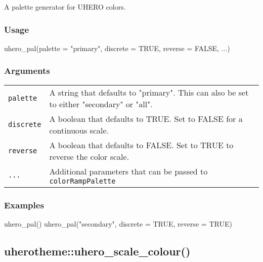 \documentclass[
  letterpaper,
  DIV=11,
  numbers=noendperiod]{scrreport}
\newenvironment{Shaded}{\begin{snugshade}}{\end{snugshade}}
\newcommand{\AttributeTok}[1]{\textcolor[rgb]{0.40,0.45,0.13}{#1}}
\newcommand{\ConstantTok}[1]{\textcolor[rgb]{0.56,0.35,0.01}{#1}}
\newcommand{\FunctionTok}[1]{\textcolor[rgb]{0.28,0.35,0.67}{#1}}
\newcommand{\NormalTok}[1]{\textcolor[rgb]{0.00,0.23,0.31}{#1}}
\newcommand{\StringTok}[1]{\textcolor[rgb]{0.13,0.47,0.30}{#1}}
\begin{document}
A palette generator for UHERO colors.

\subsubsection{Usage}\label{usage-72}

\begin{Shaded}
\begin{Highlighting}[]
\FunctionTok{uhero\_pal}\NormalTok{(}\AttributeTok{palette =} \StringTok{"primary"}\NormalTok{, }\AttributeTok{discrete =} \ConstantTok{TRUE}\NormalTok{, }\AttributeTok{reverse =} \ConstantTok{FALSE}\NormalTok{, ...)}
\end{Highlighting}
\end{Shaded}

\subsubsection{Arguments}\label{arguments-72}

\begin{longtable}[]{@{}ll@{}}
\toprule\noalign{}
\endhead
\bottomrule\noalign{}
\endlastfoot
\texttt{palette} & A string that defaults to "primary". This can also be
set to either "secondary" or "all". \\
\texttt{discrete} & A boolean that defaults to TRUE. Set to FALSE for a
continuous scale. \\
\texttt{reverse} & A boolean that defaults to FALSE. Set to TRUE to
reverse the color scale. \\
\texttt{...} & Additional parameters that can be passed to
\texttt{colorRampPalette} \\
\end{longtable}

\subsubsection{Examples}\label{examples-72}

\begin{Shaded}
\begin{Highlighting}[]
\FunctionTok{uhero\_pal}\NormalTok{()}
\FunctionTok{uhero\_pal}\NormalTok{(}\StringTok{"secondary"}\NormalTok{, }\AttributeTok{discrete =} \ConstantTok{TRUE}\NormalTok{, }\AttributeTok{reverse =} \ConstantTok{TRUE}\NormalTok{)}
\end{Highlighting}
\end{Shaded}

\subsection{uherotheme::uhero\_scale\_colour()}\label{uherothemeuhero_scale_colour}
\end{document}

